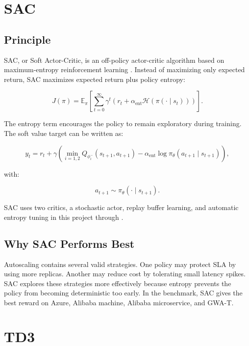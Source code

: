 \documentclass{rapportINPTCLOUD}
\newcommand{\pathcode}[1]{\texttt{\detokenize{#1}}}
\begin{document}
\section{SAC}

\subsection{Principle}

SAC, or Soft Actor-Critic, is an off-policy actor-critic algorithm based on maximum-entropy reinforcement learning \cite{haarnoja2018}. Instead of maximizing only expected return, SAC maximizes expected return plus policy entropy:

\begin{equation}
J(\pi)
=
\mathbb{E}_{\pi}
\left[
\sum_{t=0}^{\infty}
\gamma^t
\left(
r_t
+ \alpha_{\text{ent}}
\mathcal{H}
(\pi(\cdot \mid s_t))
\right)
\right].
\end{equation}

The entropy term encourages the policy to remain exploratory during training. The soft value target can be written as:

\begin{equation}
y_t =
r_t
+ \gamma
\left(
\min_{i=1,2}
Q_{\phi_i^-}(s_{t+1},a_{t+1})
- \alpha_{\text{ent}}
\log \pi_{\theta}(a_{t+1}\mid s_{t+1})
\right),
\end{equation}

with:

\begin{equation}
a_{t+1} \sim \pi_{\theta}(\cdot \mid s_{t+1}).
\end{equation}

SAC uses two critics, a stochastic actor, replay buffer learning, and automatic entropy tuning in this project through \pathcode{ent_coef="auto"}.

\subsection{Why SAC Performs Best}

Autoscaling contains several valid strategies. One policy may protect SLA by using more replicas. Another may reduce cost by tolerating small latency spikes. SAC explores these strategies more effectively because entropy prevents the policy from becoming deterministic too early. In the benchmark, SAC gives the best reward on Azure, Alibaba machine, Alibaba microservice, and GWA-T.

\section{TD3}
\end{document}
